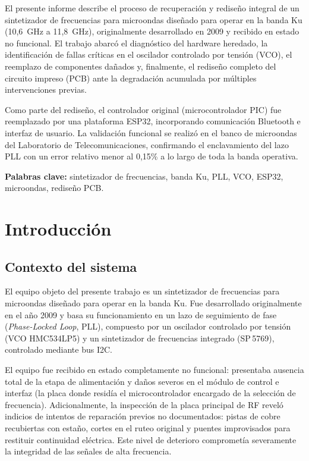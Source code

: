 \documentclass[12pt, a4paper]{article}
\begin{document}
	El presente informe describe el proceso de recuperación y rediseño integral de un sintetizador de
	frecuencias para microondas diseñado para operar en la banda Ku (10{,}6~GHz a 11{,}8~GHz),
	originalmente desarrollado en 2009 y recibido en estado no funcional. El trabajo abarcó el diagnóstico
	del hardware heredado, la identificación de fallas críticas en el oscilador controlado por tensión (VCO),
	el reemplazo de componentes dañados y, finalmente, el rediseño completo del circuito impreso (PCB)
	ante la degradación acumulada por múltiples intervenciones previas.
	
	Como parte del rediseño, el controlador original (microcontrolador PIC) fue reemplazado por una
	plataforma ESP32, incorporando comunicación Bluetooth e interfaz de usuario. La validación funcional
	se realizó en el banco de microondas del Laboratorio de Telecomunicaciones, confirmando el
	enclavamiento del lazo PLL con un error relativo menor al 0{,}15\% a lo largo de toda la banda operativa.
	
	\bigskip
	\noindent\textbf{Palabras clave:} sintetizador de frecuencias, banda Ku, PLL, VCO, ESP32, microondas, rediseño PCB.
	
	\newpage
	\tableofcontents
	\newpage
	
	\section{Introducción}
	
	\subsection{Contexto del sistema}
	
	El equipo objeto del presente trabajo es un sintetizador de frecuencias para microondas diseñado para
	operar en la banda Ku. Fue desarrollado originalmente en el año 2009 y basa su funcionamiento en un
	lazo de seguimiento de fase (\textit{Phase-Locked Loop}, PLL), compuesto por un oscilador controlado
	por tensión (VCO HMC534LP5) y un sintetizador de frecuencias integrado (SP\,5769), controlado
	mediante bus I2C.
	
	El equipo fue recibido en estado completamente no funcional: presentaba ausencia total de la etapa de
	alimentación y daños severos en el módulo de control e interfaz (la placa donde residía el
	microcontrolador encargado de la selección de frecuencia). Adicionalmente, la inspección de la placa
	principal de RF reveló indicios de intentos de reparación previos no documentados: pistas de cobre
	recubiertas con estaño, cortes en el ruteo original y puentes improvisados para restituir continuidad
	eléctrica. Este nivel de deterioro comprometía severamente la integridad de las señales de alta frecuencia.
	
\end{document}
